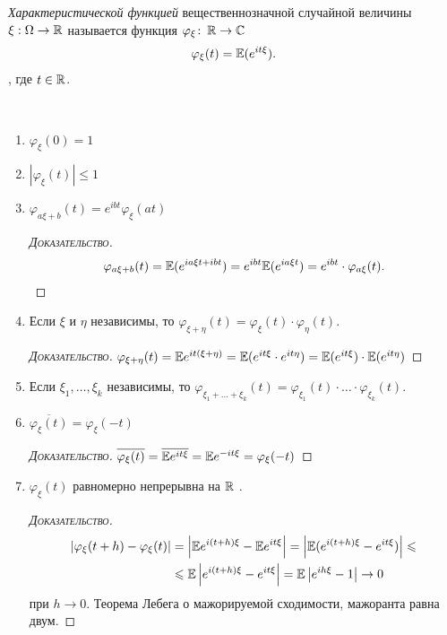 \documentclass[../main.tex]{subfiles}
\begin{document}
\begin{df}
 \textit{Характеристической функцией} вещественнозначной случайной величины $ \xi : \Omega \to \mathbb{R} $ называется функция $ \varphi_\xi \colon\, \mathbb{R} \to \mathbb{C} $
 \begin{align*}
  \varphi_\xi(t) = \mathbb E ( e^{it\xi} ).
 \end{align*}, где $ t \in \mathbb{R} $.
\end{df}
\begin{prop}\
 \begin{enumerate}
  \item $ \varphi_{\xi}(0) = 1 $
  \item $ \left|\varphi_\xi(t) \right| \leqslant 1 $
  \item $ \varphi_{a\xi + b}(t) = e^{ibt}\varphi_\xi(at) $
   \begin{proof}[\normalfont\textsc{Доказательство}]
    \begin{align*}
     \varphi_{a\xi+b}(t) = \mathbb E (e^{ia\xi t + ibt}) = e^{ibt} \mathbb E(e^{ia\xi t}) = e^{ibt} \cdot \varphi_{a\xi}(t).
    \end{align*}
   \end{proof}
  \item Если $ \xi $ и $ \eta $ независимы, то $ \varphi_{\xi + \eta}(t) = \varphi_\xi(t) \cdot \varphi_\eta(t) $.
   \begin{proof}[\normalfont\textsc{Доказательство}]
    $ \varphi_{\xi+\eta}(t) = \mathbb E e^{it(\xi + \eta)} = \mathbb E (e^{it\xi} \cdot e^{it\eta}) = \mathbb E(e^{it\xi}) \cdot \mathbb E(e^{it\eta})$ 
   \end{proof}
\item Если $ \xi_1, \ldots, \xi_k $ независимы, то $ \varphi_{\xi_1 + \ldots + \xi_k}(t) = \varphi_{\xi_1}(t) \cdot \ldots \cdot \varphi_{\xi_k}(t) $.
  \item $ \overline{\varphi_\xi(t)} = \varphi_\xi(-t) $
   \begin{proof}[\normalfont\textsc{Доказательство}]
	   $\overline{\varphi_\xi (t)} = \overline{\mathbb E e^{it\xi}} = \mathbb E e^{-it\xi} = \varphi_\xi(-t)$ 
   \end{proof}
  \item $ \varphi_\xi(t) $ равномерно непрерывна на $\mathbb{R}$ .
   \begin{proof}[\normalfont\textsc{Доказательство}]
    \begin{align*}
     \left| \varphi_\xi(t + h) - \varphi_\xi(t) \right| &= \left|\mathbb E e^{i(t+h)\xi} - \mathbb E e^{it\xi} \right| = \left| \mathbb E (e^{i(t+h)\xi} - e^{it\xi}) \right| \leqslant \\
     &\leqslant \mathbb E \left| e^{i(t+h)\xi} - e^{it\xi} \right| = \mathbb E \left| e^{ih\xi} - 1 \right| \to 0
    \end{align*} при $ h \to 0 $. Теорема Лебега о мажорируемой сходимости, мажоранта равна двум.
   \end{proof}
 \end{enumerate}
\end{prop}
\end{document}
